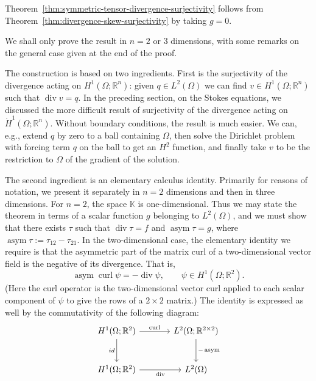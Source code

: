 {Theorem~\ref{thm:symmetric-tensor-divergence-surjectivity} follows from Theorem~\ref{thm:divergence-skew-surjectivity} by taking $g=0$.}

\begin{Proof}
{We shall only prove the result in $n=2$ or $3$ dimensions, with some remarks on the general case given at the end of the proof.}

{The construction is based on two ingredients. First is the surjectivity of the divergence acting on $H^1(\Omega;\mathbb R^n)$: given $q\in L^2(\Omega)$ we can find $v\in H^1(\Omega;\mathbb R^n)$ such that $\operatorname{div}v=q$. In the preceding section, on the Stokes equations, we discussed the more difficult result of surjectivity of the divergence acting on $\mathring H^1(\Omega;\mathbb R^n)$. Without boundary conditions, the result is much easier. We can, e.g., extend $q$ by zero to a ball containing $\Omega$, then solve the Dirichlet problem with forcing term $q$ on the ball to get an $H^2$ function, and finally take $v$ to be the restriction to $\Omega$ of the gradient of the solution.}

{The second ingredient is an elementary calculus identity. Primarily for reasons of notation, we present it separately in $n=2$ dimensions and then in three dimensions. For $n=2$, the space $\mathbb K$ is one-dimensional. Thus we may state the theorem in terms of a scalar function $g$ belonging to $L^2(\Omega)$, and we must show that there exists $\tau$ such that $\operatorname{div}\tau=f$ and $\operatorname{asym}\tau=g$, where $\operatorname{asym}\tau:=\tau_{12}-\tau_{21}$. In the two-dimensional case, the elementary identity we require is that the asymmetric part of the matrix curl of a two-dimensional vector field is the negative of its divergence. That is,}
\begin{equation}\label{eq:asym-curl-divergence-identity}
\operatorname{asym}\operatorname{curl}\psi=-\operatorname{div}\psi,\qquad\psi\in H^1(\Omega;\mathbb R^2).
\end{equation}
{(Here the curl operator is the two-dimensional vector curl applied to each scalar component of $\psi$ to give the rows of a $2\times2$ matrix.) The identity is expressed as well by the commutativity of the following diagram:}
\[
\begin{tikzcd}[column sep=large,row sep=large]
H^1(\Omega;\mathbb R^2)\arrow[r,"\operatorname{curl}"]\arrow[d,"id"']&L^2(\Omega;\mathbb R^{2\times2})\arrow[d,"-\operatorname{asym}"]\\
H^1(\Omega;\mathbb R^2)\arrow[r,"\operatorname{div}"']&L^2(\Omega)
\end{tikzcd}
\]


\end{Proof}
